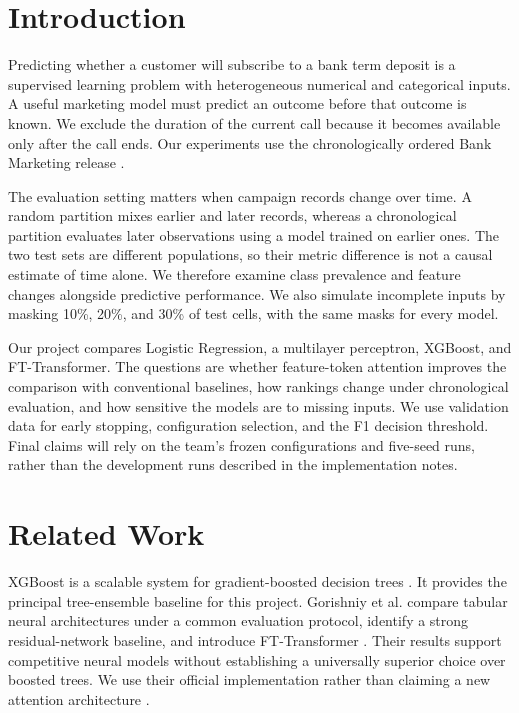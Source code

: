 \section{Introduction}
Predicting whether a customer will subscribe to a bank term deposit is a supervised
learning problem with heterogeneous numerical and categorical inputs. A useful
marketing model must predict an outcome before that outcome is known. We exclude
the duration of the current call because it becomes available only after the call
ends. Our experiments use the chronologically ordered Bank Marketing release
\cite{moro2014bank}.

The evaluation setting matters when campaign records change over time. A random
partition mixes earlier and later records, whereas a chronological partition
evaluates later observations using a model trained on earlier ones. The two test
sets are different populations, so their metric difference is not a causal estimate
of time alone. We therefore examine class prevalence and feature changes alongside
predictive performance. We also simulate incomplete inputs by masking 10\%, 20\%,
and 30\% of test cells, with the same masks for every model.

Our project compares Logistic Regression, a multilayer perceptron, XGBoost, and
FT-Transformer. The questions are whether feature-token attention improves the
comparison with conventional baselines, how rankings change under chronological
evaluation, and how sensitive the models are to missing inputs. We use validation
data for early stopping, configuration selection, and the F1 decision threshold.
Final claims will rely on the team's frozen configurations and five-seed runs,
rather than the development runs described in the implementation notes.

\section{Related Work}
XGBoost is a scalable system for gradient-boosted decision trees
\cite{chen2016xgboost}. It provides the principal tree-ensemble baseline for this
project. Gorishniy et al. compare tabular neural architectures under a common
evaluation protocol, identify a strong residual-network baseline, and introduce
FT-Transformer \cite{gorishniy2021revisiting}. Their results support competitive
neural models without establishing a universally superior choice over boosted
trees. We use their official implementation rather than claiming a new attention
architecture \cite{rtdlcode}.

